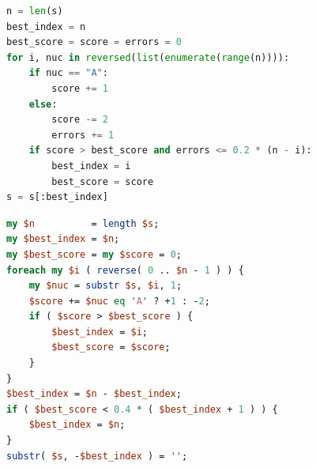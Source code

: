 \documentclass[10pt]{article}
\begin{document}
\noindent\hspace{0.20\linewidth}\begin{minipage}{0.60\textwidth}
\begin{lstlisting}[language=Python,basicstyle=\footnotesize,frame=none,caption={Python code for \texttt{cutadapt}.},label={lst:CutadaptInPython},captionpos=b]
n = len(s)
best_index = n
best_score = score = errors = 0
for i, nuc in reversed(list(enumerate(range(n)))):
    if nuc == "A":
        score += 1
    else:
        score -= 2
        errors += 1
    if score > best_score and errors <= 0.2 * (n - i):
        best_index = i
        best_score = score
s = s[:best_index]
\end{lstlisting}
\end{minipage}

\noindent\hspace{0.20\linewidth}\begin{minipage}{0.60\textwidth}
\begin{lstlisting}[language=Perl,basicstyle=\footnotesize,frame=none,caption={Perl code for a modified \texttt{cutadapt}.},label={lst:ModifiedCutadaptInPerl},captionpos=b]
my $n          = length $s;
my $best_index = $n;
my $best_score = my $score = 0;
foreach my $i ( reverse( 0 .. $n - 1 ) ) {
    my $nuc = substr $s, $i, 1;
    $score += $nuc eq 'A' ? +1 : -2;
    if ( $score > $best_score ) {
        $best_index = $i;
        $best_score = $score;
    }
}
$best_index = $n - $best_index;
if ( $best_score < 0.4 * ( $best_index + 1 ) ) {
    $best_index = $n;
}
substr( $s, -$best_index ) = '';
\end{lstlisting}
\end{minipage}
\end{document}
